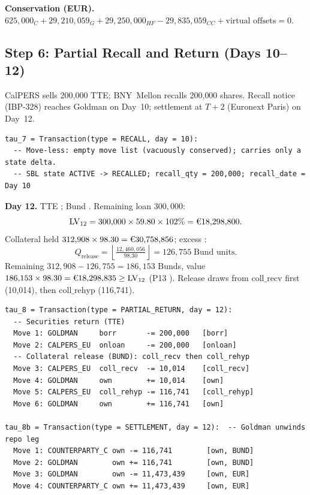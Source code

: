 \noindent\textbf{Conservation (EUR).} $625{,}000_C + 29{,}210{,}059_G + 29{,}250{,}000_{HF} - 29{,}835{,}059_{CC} + \text{virtual offsets} = 0$. \checkmark

\subsection{Step 6: Partial Recall and Return (Days 10--12)}
\label{sec:eu-step6}

CalPERS sells 200{,}000 TTE; BNY~Mellon recalls 200{,}000 shares. Recall notice (IBP-328) reaches Goldman on Day~10; settlement at $T+2$ (Euronext Paris) on Day~12.

\begin{lstlisting}
tau_7 = Transaction(type = RECALL, day = 10):
  -- Move-less: empty move list (vacuously conserved); carries only a state delta.
  -- SBL state ACTIVE -> RECALLED; recall_qty = 200,000; recall_date = Day 10
\end{lstlisting}

\noindent\textbf{Day 12.} TTE ; Bund . Remaining loan $300{,}000$:
\[
\mathrm{LV}_{12} = 300{,}000 \times 59.80 \times 102\% = \text{\EUR{18,298,800}}.
\]
Collateral held $312{,}908 \times 98.30 = \text{\EUR{30,758,856}}$; excess :
\[
Q_{\mathrm{release}} = \left\lfloor \tfrac{12{,}460{,}056}{98.30} \right\rfloor = 126{,}755 \;\text{Bund units}.
\]
Remaining $312{,}908 - 126{,}755 = 186{,}153$ Bunds, value $186{,}153 \times 98.30 = \text{\EUR{18,298,835}} \geq \mathrm{LV}_{12}$ (P13 \checkmark). Release draws from $\mathrm{coll\_recv}$ first (10{,}014), then $\mathrm{coll\_rehyp}$ (116{,}741).

\begin{lstlisting}
tau_8 = Transaction(type = PARTIAL_RETURN, day = 12):
  -- Securities return (TTE)
  Move 1: GOLDMAN     borr       -= 200,000   [borr]
  Move 2: CALPERS_EU  onloan     -= 200,000   [onloan]
  -- Collateral release (BUND): coll_recv then coll_rehyp
  Move 3: CALPERS_EU  coll_recv  -= 10,014    [coll_recv]
  Move 4: GOLDMAN     own        += 10,014    [own]
  Move 5: CALPERS_EU  coll_rehyp -= 116,741   [coll_rehyp]
  Move 6: GOLDMAN     own        += 116,741   [own]

tau_8b = Transaction(type = SETTLEMENT, day = 12):  -- Goldman unwinds repo leg
  Move 1: COUNTERPARTY_C own -= 116,741        [own, BUND]
  Move 2: GOLDMAN        own += 116,741        [own, BUND]
  Move 3: GOLDMAN        own -= 11,473,439     [own, EUR]
  Move 4: COUNTERPARTY_C own += 11,473,439     [own, EUR]
\end{lstlisting}

